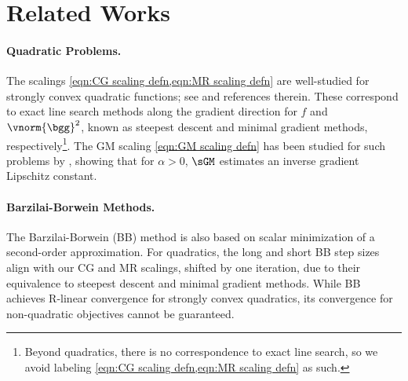 \section{Related Works}
\label{sec:related_work}
\paragraph{Quadratic Problems.} 
The scalings \cref{eqn:CG scaling defn,eqn:MR scaling defn} are well-studied for strongly convex quadratic functions; see \cite{gonzagaSteepestDescentAlgorithm2016,macdonaldFamilyRelaxedGradient2024} and references therein. These correspond to exact line search methods along the gradient direction for $f$ and $\vnorm{\bgg}^2$, known as steepest descent and minimal gradient methods, respectively\footnote{Beyond quadratics, there is no correspondence to exact line search, so we avoid labeling \cref{eqn:CG scaling defn,eqn:MR scaling defn} as such.}. The GM scaling \cref{eqn:GM scaling defn} has been studied for such problems by \cite{daiNewGradientMethod2006}, showing that for $\alpha > 0$, $\sGM$ estimates an inverse gradient Lipschitz constant.

\vspace{-1mm}
\paragraph{Barzilai-Borwein Methods.} 
The Barzilai-Borwein (BB) method \cite{barzilaiTwopointStepSize1988, fletcherBarzilaiBorweinMethod2005, daiFamilySpectralGradient2019} is also based on scalar minimization of a second-order approximation. For quadratics, the long and short BB step sizes align with our CG and MR scalings, shifted by one iteration, due to their equivalence to steepest descent and minimal gradient methods. While BB achieves R-linear convergence for strongly convex quadratics, its convergence for non-quadratic objectives cannot be guaranteed.

\vspace{-1mm}
